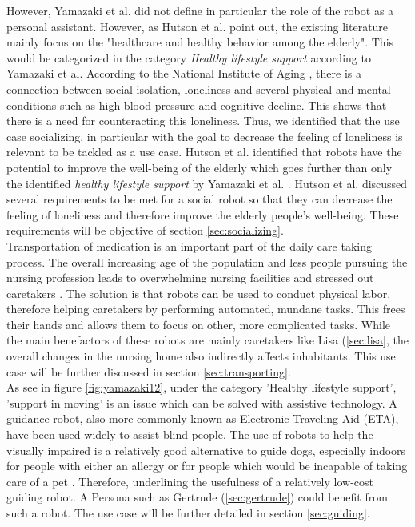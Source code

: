 \documentclass[plainarticle,zihtitle,english,final,hyperref,utf8]{zihpub}
\begin{document}
However, Yamazaki et al. \cite{yamazaki12} did not define in particular the role of the robot as a personal assistant. However, as Hutson et al.  point out, the existing literature mainly focus on the "healthcare and healthy behavior among the elderly". This would be categorized in the category \textit{Healthy lifestyle support} according to Yamazaki et al. According to the National Institute of Aging \cite{nia19}, there is a connection between social isolation, loneliness and several physical and mental conditions such as high blood pressure and cognitive decline. This shows that there is a need for counteracting this loneliness. Thus, we identified that the use case socializing, in particular with the goal to decrease the feeling of loneliness is relevant to be tackled as a use case. Hutson et al. \cite{hutson11} identified that robots have the potential to improve the well-being of the elderly which goes further than only the identified \textit{healthy lifestyle support} by Yamazaki et al.  \cite{yamazaki12}. Hutson et al. discussed several requirements to be met for a social robot so that they can decrease the feeling of loneliness and therefore improve the elderly people's well-being. These requirements will be objective of section \ref{sec:socializing}. \\
\newline
Transportation of medication is an important part of the daily care taking process. The overall increasing age of the population and less people pursuing the nursing profession leads to overwhelming nursing facilities and stressed out caretakers \cite{yamazaki12}. The solution is that robots can be used to conduct physical labor, therefore helping caretakers by performing automated, mundane tasks. This frees their hands and allows them to focus on other, more complicated tasks. While the main benefactors of these robots are mainly caretakers like Lisa (\ref{sec:lisa}, the overall changes in the nursing home also indirectly affects inhabitants. This use case will be further discussed in section \ref{sec:transporting}.\\
\newline
As see in figure \ref{fig:yamazaki12}, under the category 'Healthy lifestyle support', 'support in moving' is an issue which can be solved with assistive technology.
A guidance robot, also more commonly known as Electronic Traveling Aid (ETA), have been used widely to assist blind people. The use of robots to help the visually impaired is a relatively good alternative to guide dogs, especially indoors for people with either an allergy or for people which would be incapable of taking care of a pet \cite{Alhmiedat2013}. Therefore, underlining the usefulness of a relatively low-cost guiding robot. A Persona such as Gertrude (\ref{sec:gertrude}) could benefit from such a robot.
The use case will be further detailed in section \ref{sec:guiding}.
\newline
\end{document}
